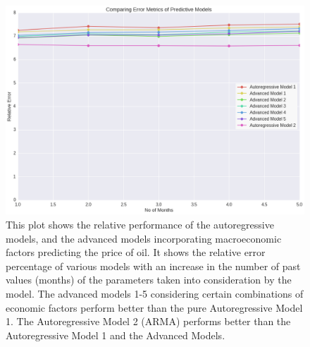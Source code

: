 \documentclass[runningheads]{llncs}
\begin{document}
\begin{figure}
\centering
\includegraphics[width=\textwidth]{ModelComparison_Oil.png}
\caption{This plot shows the relative performance of the autoregressive models, and the advanced models incorporating macroeconomic factors predicting the price of oil. It shows the relative error percentage of various models with an increase in the number of past values (months) of the parameters taken into consideration by the model. The advanced models 1-5 considering certain combinations of economic factors perform better than the pure Autoregressive Model 1. The Autoregressive Model 2 (ARMA) performs better than the Autoregressive Model 1 and the Advanced Models. }
\label{fig:ModelComparison_Oil.png}
\end{figure}
\end{document}
